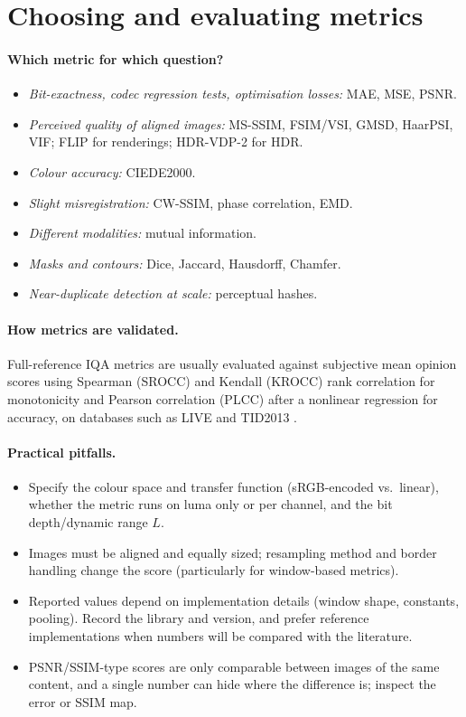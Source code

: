\section{Choosing and evaluating metrics}

\paragraph{Which metric for which question?}
\begin{itemize}
  \item \emph{Bit-exactness, codec regression tests, optimisation losses:} MAE, MSE, PSNR.
  \item \emph{Perceived quality of aligned images:} MS-SSIM, FSIM/VSI, GMSD, HaarPSI, VIF; FLIP for renderings; HDR-VDP-2 for HDR.
  \item \emph{Colour accuracy:} CIEDE2000.
  \item \emph{Slight misregistration:} CW-SSIM, phase correlation, EMD.
  \item \emph{Different modalities:} mutual information.
  \item \emph{Masks and contours:} Dice, Jaccard, Hausdorff, Chamfer.
  \item \emph{Near-duplicate detection at scale:} perceptual hashes.
\end{itemize}

\paragraph{How metrics are validated.}
Full-reference IQA metrics are usually evaluated against subjective mean opinion scores using Spearman (SROCC) and Kendall (KROCC) rank correlation for monotonicity and Pearson correlation (PLCC) after a nonlinear regression for accuracy, on databases such as LIVE \citep{sheikh2006statistical} and TID2013 \citep{ponomarenko2015tid2013}.

\paragraph{Practical pitfalls.}
\begin{itemize}
  \item Specify the colour space and transfer function (sRGB-encoded vs.\ linear), whether the metric runs on luma only or per channel, and the bit depth/dynamic range $L$.
  \item Images must be aligned and equally sized; resampling method and border handling change the score (particularly for window-based metrics).
  \item Reported values depend on implementation details (window shape, constants, pooling). Record the library and version, and prefer reference implementations when numbers will be compared with the literature.
  \item PSNR/SSIM-type scores are only comparable between images of the same content, and a single number can hide where the difference is; inspect the error or SSIM map.
\end{itemize}

